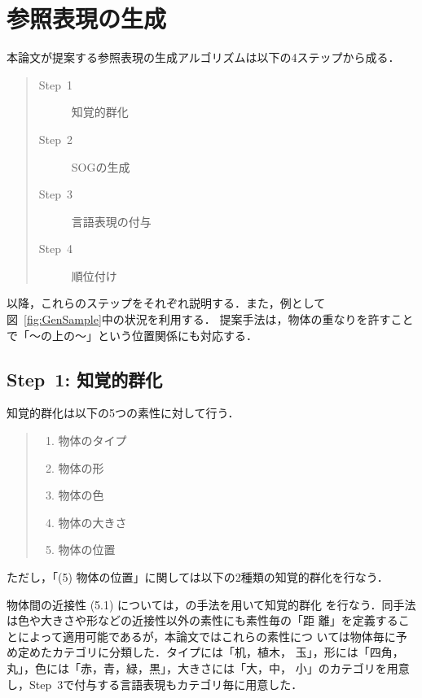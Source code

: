 \documentclass[japanese]{jnlp_1.2}
\begin{document}
\section{参照表現の生成}\label{sec:Generation}

本論文が提案する参照表現の生成アルゴリズムは以下の4ステップから成る．
\begin{quote}
\begin{description}
\item[Step~1] 知覚的群化
\item[Step~2] SOGの生成
\item[Step~3] 言語表現の付与
\item[Step~4] 順位付け
\end{description}
\end{quote}
以降，これらのステップをそれぞれ説明する．また，例として
図~\ref{fig:GenSample}中の状況を利用する．
提案手法は，物体の重なりを許すことで「〜の上の〜」という位置関係にも対応する．

\subsection*{Step~1: 知覚的群化}

知覚的群化は以下の5つの素性に対して行う．
\begin{quote}
\begin{enumerate}
\item 物体のタイプ
\item 物体の形
\item 物体の色
\item 物体の大きさ
\item 物体の位置
\end{enumerate}
\end{quote}

ただし，「(5) 物体の位置」に関しては以下の2種類の知覚的群化を行なう．
\begin{quote}
\end{quote}

物体間の近接性 (5.1) については，\cite{KT1994}の手法を用いて知覚的群化
を行なう．同手法は色や大きさや形などの近接性以外の素性にも素性毎の「距
離」を定義することによって適用可能であるが，本論文ではこれらの素性につ
いては物体毎に予め定めたカテゴリに分類した．タイプには「机，植木，
玉」，形には「四角，丸」，色には「赤，青，緑，黒」，大きさには「大，中，
小」のカテゴリを用意し，Step~3で付与する言語表現もカテゴリ毎に用意した．
\end{document}
